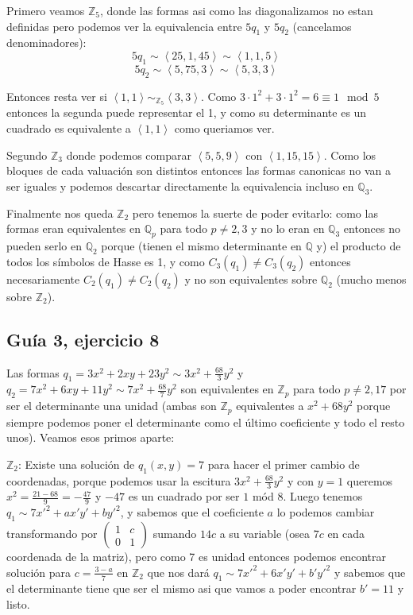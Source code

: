 \documentclass[12pt]{amsart}
\newcommand{\QQ}{\mathbb{Q}}
\newcommand{\ZZ}{\mathbb{Z}}
\newcommand{\minimat}[4]{\left(\begin{smallmatrix} #1 & #2 \\ #3 & #4 
\end{smallmatrix}\right)}
\newcommand{\lc}{\left<}
\newcommand{\rc}{\right>}
\theoremstyle{plain}
\begin{document}
Primero veamos $\ZZ_5$, donde las formas asi como las 
diagonalizamos no estan definidas pero podemos ver la 
equivalencia entre $5q_1$ y $5q_2$ (cancelamos 
denominadores):
$$5q_1 \sim \lc 25,1,45\rc\sim\lc 1,1,5\rc$$
$$5q_2 \sim \lc 5,75,3\rc \sim\lc 5,3,3\rc$$

Entonces resta ver si $\lc 1,1\rc\sim_{\ZZ_5}\lc 3,3\rc$. 
Como $3\cdot 1^2+3\cdot 1^2=6\equiv 1 \mod 5$ entonces la 
segunda puede representar el 1, y como su determinante es
un cuadrado es equivalente a $\lc 1,1\rc$ como queriamos ver.

Segundo $\ZZ_3$ donde podemos comparar $\lc 5,5,9\rc$ con 
$\lc 1,15,15\rc$. Como los bloques de cada valuación son 
distintos entonces las formas canonicas no van a ser iguales
y podemos descartar directamente la equivalencia incluso en
$\QQ_3$.

Finalmente nos queda $\ZZ_2$ pero tenemos la suerte de poder
evitarlo: como las formas eran equivalentes en $\QQ_p$ para
todo $p\neq 2,3$ y no lo eran en $\QQ_3$ entonces no pueden 
serlo en $\QQ_2$ porque (tienen el mismo determinante en 
$\QQ$ y) el producto de todos los símbolos de Hasse es 1, y 
como $C_3(q_1)\neq C_3(q_2)$ entonces necesariamente 
$C_2(q_1)\neq C_2(q_2)$ y no son equivalentes sobre $\QQ_2$
(mucho menos sobre $\ZZ_2$). 


\subsection*{Guía 3, ejercicio 8} 
Las formas $q_1=3x^2+2xy+23y^2\sim 3x^2+\frac{68}{3}y^2$ 
y $q_2=7x^2+6xy+11y^2\sim7x^2+\frac{68}{7}y^2$ son 
equivalentes en $\ZZ_p$ para todo $p\neq2,17$ por ser el 
determinante una unidad (ambas son $\ZZ_p$ equivalentes 
a $x^2+68y^2$ porque siempre podemos poner el determinante
como el último coeficiente y todo el resto unos). Veamos 
esos primos aparte:

$\ZZ_2$: Existe una solución de $q_1(x,y)=7$ para hacer 
el primer cambio de coordenadas, porque podemos usar la escitura
$3x^2+\frac{68}{3}y^2$ y con $y=1$ queremos $x^2=\frac{21-68}{9}=
-\frac{47}{9}$ y $-47$ es un cuadrado por ser $1$ mód $8$. Luego
tenemos $q_1 \sim 7x'^2 + ax'y' + by'^2$, y sabemos que el 
coeficiente $a$ lo podemos cambiar transformando por 
$\minimat{1}{c}{0}{1}$ sumando $14c$ a su variable (osea $7c$ 
en cada coordenada de la matriz), pero como 7 
es unidad entonces podemos encontrar solución para $c = 
\frac{3-a}{7}$ en $\ZZ_2$ que nos dará $q_1\sim 7x'^2 + 6x'y' + 
b'y'^2$ y sabemos que el determinante tiene que ser el mismo asi 
que vamos a poder encontrar $b'= 11$ y listo.
\end{document}
